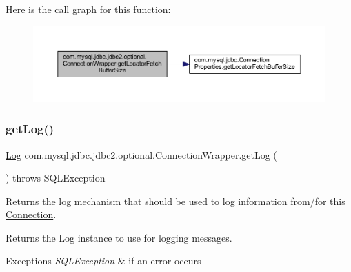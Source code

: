 Here is the call graph for this function\+:
\nopagebreak
\begin{figure}[H]
\begin{center}
\leavevmode
\includegraphics[width=350pt]{classcom_1_1mysql_1_1jdbc_1_1jdbc2_1_1optional_1_1_connection_wrapper_a4232a575ece7c1b11147d5947bd7404c_cgraph}
\end{center}
\end{figure}
\mbox{\label{classcom_1_1mysql_1_1jdbc_1_1jdbc2_1_1optional_1_1_connection_wrapper_ab6845a61a447081e344ae983d1f424da}} 
\subsubsection{\texorpdfstring{get\+Log()}{getLog()}}
{\footnotesize\ttfamily \mbox{\hyperlink{interfacecom_1_1mysql_1_1jdbc_1_1log_1_1_log}{Log}} com.\+mysql.\+jdbc.\+jdbc2.\+optional.\+Connection\+Wrapper.\+get\+Log (\begin{DoxyParamCaption}{ }\end{DoxyParamCaption}) throws S\+Q\+L\+Exception}

Returns the log mechanism that should be used to log information from/for this \mbox{\hyperlink{interfacecom_1_1mysql_1_1jdbc_1_1_connection}{Connection}}.

\begin{DoxyReturn}{Returns}
the Log instance to use for logging messages. 
\end{DoxyReturn}

\begin{DoxyExceptions}{Exceptions}
{\em S\+Q\+L\+Exception} & if an error occurs \\
\hline
\end{DoxyExceptions}


